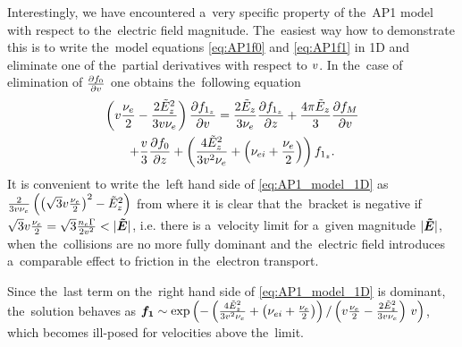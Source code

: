 Interestingly, we have encountered a~very specific property of the~AP1 model
with respect to the~electric field magnitude. The~easiest way how to 
demonstrate this is to write the~model equations \eqref{eq:AP1f0} and 
\eqref{eq:AP1f1} in 1D and eliminate one of the~partial derivatives with 
respect to $v$. In the~case of elimination of $\frac{\partial{f_0}}{\partial{v}}$ 
one obtains the~following equation
\begin{multline}
  \left(v\frac{\nu_{e}}{2} - \frac{2\tilde{E}_z^2}{3v\nu_{e}}\right) 
  \frac{\partial{f_{1_z}}}{\partial{v}} 
  =
  \frac{2\tilde{E}_z}{3\nu_{e}}\frac{\partial{f_{1_z}}}{\partial{z}}  
  + \frac{4\pi\tilde{E}_z}{3}\frac{\partial{f_M}}{\partial{v}} \\
  + \frac{v}{3}\frac{\partial{f_0}}{\partial{z}} 
  + \left(\frac{4\tilde{E}_z^2}{3v^2\nu_{e}}
  + \left(\nu_{ei} + \frac{\nu_{e}}{2}\right) \right)f_{1_z} .
  \label{eq:AP1_model_1D}
\end{multline}
It is convenient to write the~left hand side of \eqref{eq:AP1_model_1D} as
$\frac{2}{3v\nu_{e}} 
\left(\left(\sqrt{3}v\frac{\nu_{e}}{2}\right)^2 - \tilde{E}_z^2\right)$
from where it is clear that the~bracket is negative if 
$\sqrt{3}v\frac{\nu_{e}}{2} =  \sqrt{3}\frac{n_e \Gamma}{2v^2} < |\boldsymbol{\tilde{E}}|$, 
i.e. there is a~velocity limit for a~given magnitude $|\boldsymbol{\tilde{E}}|$, 
when the~collisions are no more fully dominant and the~electric field 
introduces a~comparable effect to friction in the~electron transport.

Since the~last term on the~right hand side of \eqref{eq:AP1_model_1D} 
is dominant, the~solution behaves as 
$\boldsymbol{f_1} \sim \exp\left(-\left(\frac{4\tilde{E}_z^2}{3v^2\nu_{e}}
  + \left(\nu_{ei} + \frac{\nu_{e}}{2}\right) \right)/
\left(v\frac{\nu_{e}}{2} - \frac{2\tilde{E}_z^2}{3v\nu_{e}}\right)\, v\right)$, 
which becomes ill-posed for velocities above the~limit.

